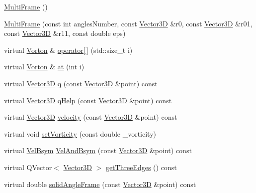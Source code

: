 \begin{DoxyCompactItemize}
\item 
\mbox{\hyperlink{class_multi_frame_a08ec547ed70cf94539b3a52c2b51363b}{Multi\+Frame}} ()
\item 
\mbox{\hyperlink{class_multi_frame_ac999837ae56636f06eafc9b932c37082}{Multi\+Frame}} (const int angles\+Number, const \mbox{\hyperlink{class_vector3_d}{Vector3D}} \&r0, const \mbox{\hyperlink{class_vector3_d}{Vector3D}} \&r01, const \mbox{\hyperlink{class_vector3_d}{Vector3D}} \&r11, const double eps)
\item 
virtual \mbox{\hyperlink{class_vorton}{Vorton}} \& \mbox{\hyperlink{class_multi_frame_ad2dbc878f956dcf3301c6a7138411e6c}{operator\mbox{[}$\,$\mbox{]}}} (std\+::size\+\_\+t i)
\item 
virtual \mbox{\hyperlink{class_vorton}{Vorton}} \& \mbox{\hyperlink{class_multi_frame_a5295ef9753e14e5ea136a18563a918b8}{at}} (int i)
\item 
virtual \mbox{\hyperlink{class_vector3_d}{Vector3D}} \mbox{\hyperlink{class_multi_frame_a7bc27f76622612b9ccef915c848e492d}{q}} (const \mbox{\hyperlink{class_vector3_d}{Vector3D}} \&point) const
\item 
virtual \mbox{\hyperlink{class_vector3_d}{Vector3D}} \mbox{\hyperlink{class_multi_frame_a8da38b4d64ae762dfcb995911031ebf8}{q\+Help}} (const \mbox{\hyperlink{class_vector3_d}{Vector3D}} \&point) const
\item 
virtual \mbox{\hyperlink{class_vector3_d}{Vector3D}} \mbox{\hyperlink{class_multi_frame_a18a1755403fa12c2f59e81078e1dd34e}{velocity}} (const \mbox{\hyperlink{class_vector3_d}{Vector3D}} \&point) const
\item 
virtual void \mbox{\hyperlink{class_multi_frame_ae06b45f3403f1c6b03d3c6d58aa9f519}{set\+Vorticity}} (const double \+\_\+vorticity)
\item 
virtual \mbox{\hyperlink{struct_vel_bsym}{Vel\+Bsym}} \mbox{\hyperlink{class_multi_frame_a60269c2c56aace32bb0fe0a70731a309}{Vel\+And\+Bsym}} (const \mbox{\hyperlink{class_vector3_d}{Vector3D}} \&point) const
\item 
virtual Q\+Vector$<$ \mbox{\hyperlink{class_vector3_d}{Vector3D}} $>$ \mbox{\hyperlink{class_multi_frame_a0860bf9a98789ee07334f28e0015769a}{get\+Three\+Edges}} () const
\item 
virtual double \mbox{\hyperlink{class_multi_frame_af0c54493c44094ca492e2ec653a3a956}{solid\+Angle\+Frame}} (const \mbox{\hyperlink{class_vector3_d}{Vector3D}} \&point) const
\item 

\end{DoxyCompactItemize}
